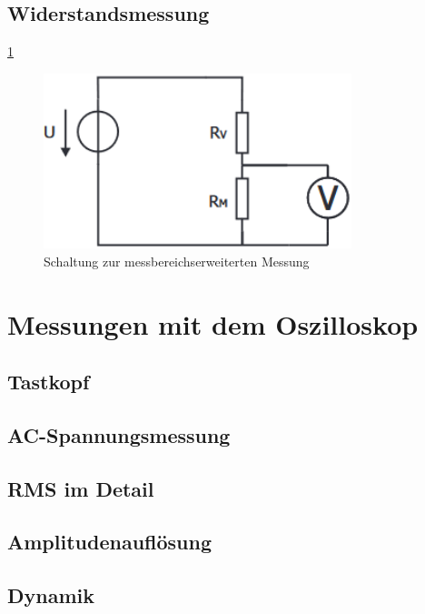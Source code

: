 \documentclass[a4paper]{article}
\begin{document}
\subsection{Widerstandsmessung}
\ref{fig:MB-Erweiterung}
\begin{figure}[h]
	\centering
	\includegraphics[width=0.8\textwidth]{schematics/1c_MessbereichserweiterungVM.png}
	\caption{Schaltung zur messbereichserweiterten Messung}
	\label{fig:MB-Erweiterung}
\end{figure}

\section{Messungen mit dem Oszilloskop}
\subsection{Tastkopf}
\subsection{AC-Spannungsmessung}
\subsection{RMS im Detail}
\subsection{Amplitudenauflösung}
\subsection{Dynamik}
\end{document}
